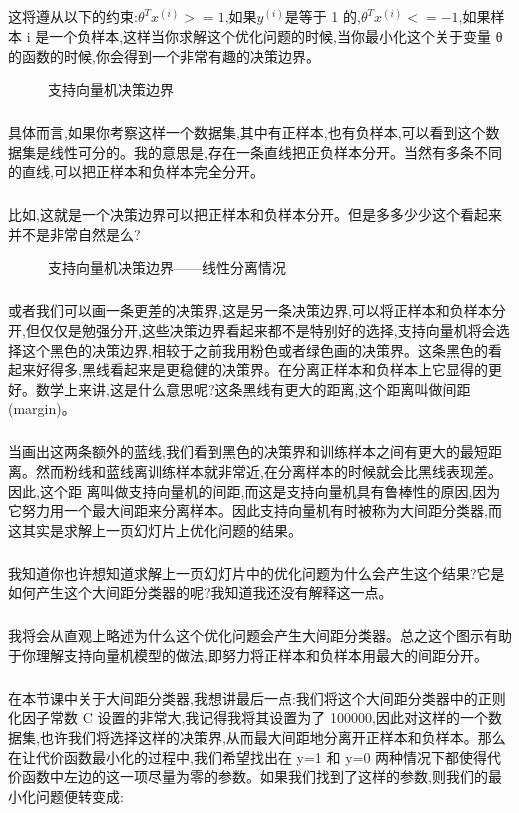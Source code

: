 \documentclass{article}
\begin{document}
\begin{CJK}{UTF8}{gbsn}
\subparagraph{}
这将遵从以下的约束:$\theta^Tx^{(i)}>=1$,如果$y^{(i)}$是等于 1 的,$\theta^Tx^{(i)}<=-1$,如果样本 i 是一个负样本,这样当你求解这个优化问题的时候,当你最小化这个关于变量 θ 的函数的时候,你会得到一个非常有趣的决策边界。
\begin{figure}[H]
\label{fig:708}
\caption{支持向量机决策边界}
\end{figure}
\subparagraph{}
具体而言,如果你考察这样一个数据集,其中有正样本,也有负样本,可以看到这个数据集是线性可分的。我的意思是,存在一条直线把正负样本分开。当然有多条不同的直线,可以把正样本和负样本完全分开。
\subparagraph{}
比如,这就是一个决策边界可以把正样本和负样本分开。但是多多少少这个看起来并不是非常自然是么?
\begin{figure}[H]
\label{fig:712}
\caption{支持向量机决策边界——线性分离情况}
\end{figure}
\subparagraph{}
或者我们可以画一条更差的决策界,这是另一条决策边界,可以将正样本和负样本分开,但仅仅是勉强分开,这些决策边界看起来都不是特别好的选择,支持向量机将会选择这个黑色的决策边界,相较于之前我用粉色或者绿色画的决策界。这条黑色的看起来好得多,黑线看起来是更稳健的决策界。在分离正样本和负样本上它显得的更好。数学上来讲,这是什么意思呢?这条黑线有更大的距离,这个距离叫做间距 (margin)。
\subparagraph{}
当画出这两条额外的蓝线,我们看到黑色的决策界和训练样本之间有更大的最短距离。然而粉线和蓝线离训练样本就非常近,在分离样本的时候就会比黑线表现差。因此,这个距
离叫做支持向量机的间距,而这是支持向量机具有鲁棒性的原因,因为它努力用一个最大间距来分离样本。因此支持向量机有时被称为大间距分类器,而这其实是求解上一页幻灯片上优化问题的结果。
\subparagraph{}
我知道你也许想知道求解上一页幻灯片中的优化问题为什么会产生这个结果?它是如何产生这个大间距分类器的呢?我知道我还没有解释这一点。
\subparagraph{}
我将会从直观上略述为什么这个优化问题会产生大间距分类器。总之这个图示有助于你理解支持向量机模型的做法,即努力将正样本和负样本用最大的间距分开。
\begin{figure}[H]
\label{fig:709}
\end{figure}
\begin{figure}[H]
\label{fig:710}
\end{figure}
\begin{figure}[H]
\label{fig:711}
\end{figure}
\subparagraph{} 
在本节课中关于大间距分类器,我想讲最后一点:我们将这个大间距分类器中的正则化因子常数 C 设置的非常大,我记得我将其设置为了 100000,因此对这样的一个数据集,也许我们将选择这样的决策界,从而最大间距地分离开正样本和负样本。那么在让代价函数最小化的过程中,我们希望找出在 y=1 和 y=0 两种情况下都使得代价函数中左边的这一项尽量为零的参数。如果我们找到了这样的参数,则我们的最小化问题便转变成:

\end{CJK}
\end{document}
